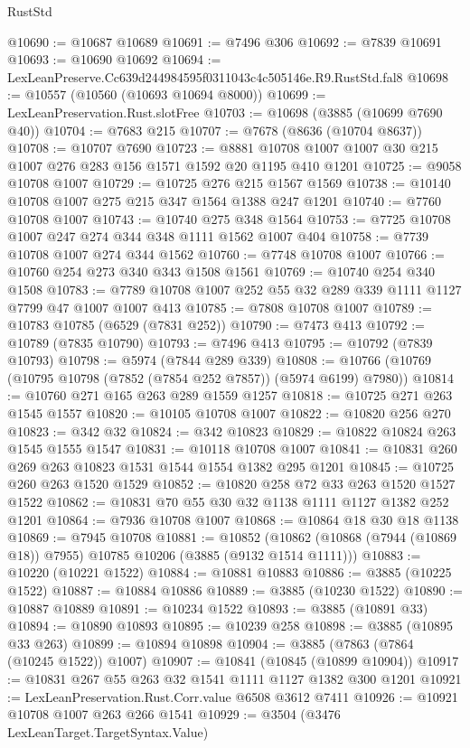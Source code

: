 \begin{lexlean}{RustStd}
\begin{coremodule}
@10690 := @10687 @10689
@10691 := @7496 @306
@10692 := @7839 @10691
@10693 := @10690 @10692
@10694 := LexLeanPreserve.Cc639d244984595f0311043c4c505146e.R9.RustStd.fal8
@10698 := @10557 (@10560 (@10693 @10694 @8000))
@10699 := LexLeanPreservation.Rust.slotFree
@10703 := @10698 (@3885 (@10699 @7690 @40))
@10704 := @7683 @215
@10707 := @7678 (@8636 (@10704 @8637))
@10708 := @10707 @7690
@10723 := @8881 @10708 @1007 @1007 @30 @215 @1007 @276 @283 @156 @1571 @1592 @20 @1195 @410 @1201
@10725 := @9058 @10708 @1007
@10729 := @10725 @276 @215 @1567 @1569
@10738 := @10140 @10708 @1007 @275 @215 @347 @1564 @1388 @247 @1201
@10740 := @7760 @10708 @1007
@10743 := @10740 @275 @348 @1564
@10753 := @7725 @10708 @1007 @247 @274 @344 @348 @1111 @1562 @1007 @404
@10758 := @7739 @10708 @1007 @274 @344 @1562
@10760 := @7748 @10708 @1007
@10766 := @10760 @254 @273 @340 @343 @1508 @1561
@10769 := @10740 @254 @340 @1508
@10783 := @7789 @10708 @1007 @252 @55 @32 @289 @339 @1111 @1127 @7799 @47 @1007 @1007 @413
@10785 := @7808 @10708 @1007
@10789 := @10783 @10785 (@6529 (@7831 @252))
@10790 := @7473 @413
@10792 := @10789 (@7835 @10790)
@10793 := @7496 @413
@10795 := @10792 (@7839 @10793)
@10798 := @5974 (@7844 @289 @339)
@10808 := @10766 (@10769 (@10795 @10798 (@7852 (@7854 @252 @7857)) (@5974 @6199) @7980))
@10814 := @10760 @271 @165 @263 @289 @1559 @1257
@10818 := @10725 @271 @263 @1545 @1557
@10820 := @10105 @10708 @1007
@10822 := @10820 @256 @270
@10823 := @342 @32
@10824 := @342 @10823
@10829 := @10822 @10824 @263 @1545 @1555 @1547
@10831 := @10118 @10708 @1007
@10841 := @10831 @260 @269 @263 @10823 @1531 @1544 @1554 @1382 @295 @1201
@10845 := @10725 @260 @263 @1520 @1529
@10852 := @10820 @258 @72 @33 @263 @1520 @1527 @1522
@10862 := @10831 @70 @55 @30 @32 @1138 @1111 @1127 @1382 @252 @1201
@10864 := @7936 @10708 @1007
@10868 := @10864 @18 @30 @18 @1138
@10869 := @7945 @10708
@10881 := @10852
    (@10862 (@10868 (@7944 (@10869 @18)) @7955) @10785 @10206 (@3885 (@9132 @1514 @1111)))
@10883 := @10220 (@10221 @1522)
@10884 := @10881 @10883
@10886 := @3885 (@10225 @1522)
@10887 := @10884 @10886
@10889 := @3885 (@10230 @1522)
@10890 := @10887 @10889
@10891 := @10234 @1522
@10893 := @3885 (@10891 @33)
@10894 := @10890 @10893
@10895 := @10239 @258
@10898 := @3885 (@10895 @33 @263)
@10899 := @10894 @10898
@10904 := @3885 (@7863 (@7864 (@10245 @1522)) @1007)
@10907 := @10841 (@10845 (@10899 @10904))
@10917 := @10831 @267 @55 @263 @32 @1541 @1111 @1127 @1382 @300 @1201
@10921 := LexLeanPreservation.Rust.Corr.value @6508 @3612 @7411
@10926 := @10921 @10708 @1007 @263 @266 @1541
@10929 := @3504 (@3476 LexLeanTarget.TargetSyntax.Value)

\end{coremodule}
\end{lexlean}
